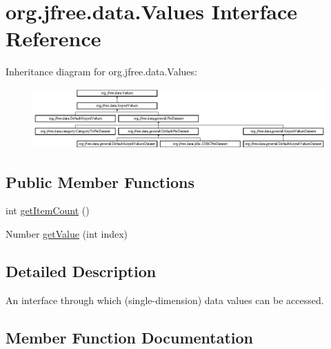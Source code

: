 \hypertarget{interfaceorg_1_1jfree_1_1data_1_1_values}{}\section{org.\+jfree.\+data.\+Values Interface Reference}
\label{interfaceorg_1_1jfree_1_1data_1_1_values}
Inheritance diagram for org.\+jfree.\+data.\+Values\+:\begin{figure}[H]
\begin{center}
\leavevmode
\includegraphics[height=2.295082cm]{interfaceorg_1_1jfree_1_1data_1_1_values}
\end{center}
\end{figure}
\subsection*{Public Member Functions}
\begin{DoxyCompactItemize}
\item 
int \mbox{\hyperlink{interfaceorg_1_1jfree_1_1data_1_1_values_afd00781dbc2e351b7a77aca9a91ca0a9}{get\+Item\+Count}} ()
\item 
Number \mbox{\hyperlink{interfaceorg_1_1jfree_1_1data_1_1_values_a660d7e60de9e6ed7a3d2c22eb6578ced}{get\+Value}} (int index)
\end{DoxyCompactItemize}


\subsection{Detailed Description}
An interface through which (single-\/dimension) data values can be accessed. 

\subsection{Member Function Documentation}
\mbox{\label{interfaceorg_1_1jfree_1_1data_1_1_values_afd00781dbc2e351b7a77aca9a91ca0a9}} 
